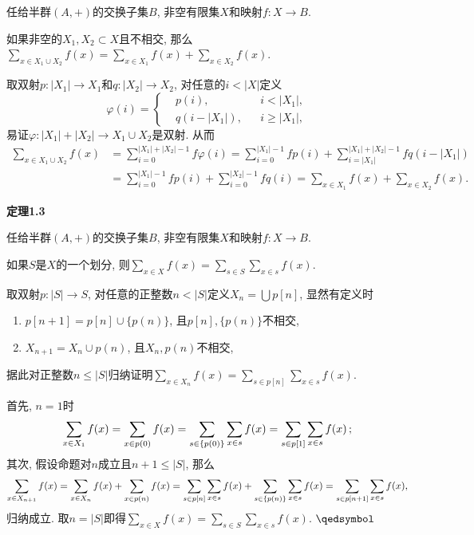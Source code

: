\documentclass[UTF8]{ctexart}
\begin{document}
任给半群$(A,+)$的交换子集$B$, 非空有限集$X$和映射$f:X\to B$.

\vspace{3pt}
如果非空的$X_1,X_2\subset X$且不相交, 那么
$\displaystyle\sum_{x\in X_1\cup X_2}f(x)=\sum_{x\in X_1}f(x)+\sum_{x\in X_2}f(x)$.


取双射$p:|X_1|\to X_1$和$q:|X_2|\to X_2$, 对任意的$i<|X|$定义
\[\varphi(i)=\left\{\begin{aligned}
    &p(i),&&i<|X_1|,\\[-3pt]
    &q(i-|X_1|),&&i\geqslant|X_1|,
\end{aligned}\right.\]
易证$\varphi:|X_1|+|X_2|\to X_1\cup X_2$是双射. 从而
\vspace{5pt}
\begin{equation*}\begin{aligned}
    \sum_{x\in X_1\cup X_2}f(x)&=\sum_{i=0}^{|X_1|+|X_2|-1}f\varphi(i)=
    \sum_{i=0}^{|X_1|-1}fp(i)+\sum_{i=|X_1|}^{|X_1|+|X_2|-1}fq(i-|X_1|)\\[3pt]
    &=\sum_{i=0}^{|X_1|-1}fp(i)+\sum_{i=0}^{|X_2|-1}fq(i)=
    \sum_{x\in X_1}f(x)+\sum_{x\in X_2}f(x).
\end{aligned}\tag*{\qedsymbol}\end{equation*}

\vspace{13pt}

\hypertarget{sec:定理1.3}{}
\noindent\textbf{定理1.3}

任给半群$(A,+)$的交换子集$B$, 非空有限集$X$和映射$f:X\to B$.

\vspace{3pt}
如果$S$是$X$的一个划分, 则$\displaystyle\sum_{x\in X}f(x)=
\sum_{s\in S}\sum_{x\in s}f(x)$.


取双射$p:|S|\to S$, 对任意的正整数$n<|S|$定义$\displaystyle X_n=\bigcup p[n]$,
显然有定义时
\vspace{1pt}
\begin{enumerate}
    \item $p[n+1]=p[n]\cup\{p(n)\}$, 且$p[n],\{p(n)\}$不相交,
    \vspace{1pt}
    \item $X_{n+1}=X_n\cup p(n)$, 且$X_n,p(n)$不相交,
\end{enumerate}
\vspace{3pt}
据此对正整数$n\leqslant|S|$归纳证明$\displaystyle
\sum_{x\in X_n}f(x)=\sum_{s\in p[n]}\sum_{x\in s}f(x)$.

首先, $n=1$时
\[
    \sum_{x\in X_1}f(x)=\sum_{x\in p(0)}f(x)=
    \sum_{s\in\{p(0)\}}\sum_{x\in s}f(x)=
    \sum_{s\in p[1]}\sum_{x\in s}f(x)\,;\\[3pt]
\]
其次, 假设命题对$n$成立且$n+1\leqslant|S|$, 那么
\vspace{3pt}
\[
    \sum_{x\in X_{n+1}}f(x)=\sum_{x\in X_n}f(x)+\sum_{x\in p(n)}f(x)=
    \sum_{s\in p[n]}\sum_{x\in s}f(x)+\sum_{s\in\{p(n)\}}\sum_{x\in s}f(x)=
    \sum_{s\in p[n+1]}\sum_{x\in s}f(x),\\[5pt]
\]
归纳成立. 取$n=|S|$即得$\displaystyle\sum_{x\in X}f(x)=
\sum_{s\in S}\sum_{x\in s}f(x)$. \hfill $\qedsymbol$
\end{document}
